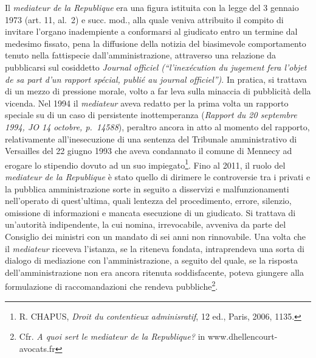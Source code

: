 \documentclass[12pt,it,a4paper,]{report}
\begin{document}
Il \emph{mediateur de la Republique} era una figura istituita con la
legge del 3 gennaio 1973 (art. 11, al.~2) e succ. mod., alla quale
veniva attribuito il compito di invitare l'organo inadempiente a
conformarsi al giudicato entro un termine dal medesimo fissato, pena la
diffusione della notizia del biasimevole comportamento tenuto nella
fattispecie dall'amministrazione, attraverso una relazione da
pubblicarsi sul cosiddetto \emph{Journal officiel (``l'inexécution du
jugement fera l'objet de sa part d'un rapport spécial, publié au journal
officiel'')}. In pratica, si trattava di un mezzo di pressione morale,
volto a far leva sulla minaccia di pubblicità della vicenda. Nel 1994 il
\emph{mediateur} aveva redatto per la prima volta un rapporto speciale
su di un caso di persistente inottemperanza (\emph{Rapport du 20
septembre 1994, JO 14 octobre, p.~14588}), peraltro ancora in atto al
momento del rapporto, relativamente all'inesecuzione di una sentenza del
Tribunale amministrativo di Versailles del 22 giugno 1993 che aveva
condannato il comune di Mennecy ad erogare lo stipendio dovuto ad un suo
impiegato\footnote{R. CHAPUS, \emph{Droit du contentieux adminisratif},
  12 ed., Paris, 2006, 1135.}. Fino al 2011, il ruolo del
\emph{mediateur de la Republique} è stato quello di dirimere le
controversie tra i privati e la pubblica amministrazione sorte in
seguito a disservizi e malfunzionamenti nell'operato di quest'ultima,
quali lentezza del procedimento, errore, silenzio, omissione di
informazioni e mancata esecuzione di un giudicato. Si trattava di
un'autorità indipendente, la cui nomina, irrevocabile, avveniva da parte
del Consiglio dei ministri con un mandato di sei anni non rinnovabile.
Una volta che il \emph{mediateur} riceveva l'istanza, se la riteneva
fondata, intraprendeva una sorta di dialogo di mediazione con
l'amministrazione, a seguito del quale, se la risposta
dell'amministrazione non era ancora ritenuta soddisfacente, poteva
giungere alla formulazione di raccomandazioni che rendeva
pubbliche\footnote{Cfr. \emph{A quoi sert le mediateur de la
  Republique?} in www.dhellencourt-avocats.fr}.
\end{document}
